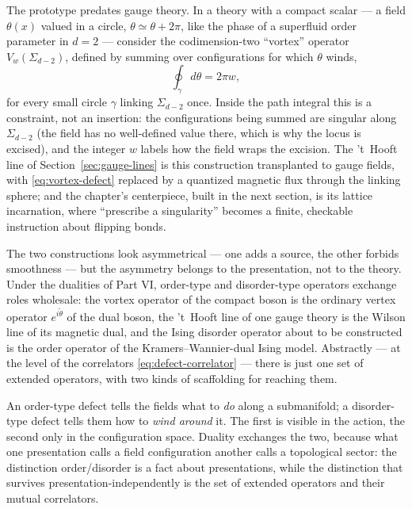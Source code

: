 The prototype predates gauge theory. In a theory with a compact scalar ---
a field $\theta(x)$ valued in a circle, $\theta \simeq \theta + 2\pi$, like
the phase of a superfluid order parameter in $d = 2$ --- consider the
codimension-two ``vortex'' operator $V_w(\Sigma_{d-2})$, defined by summing
over configurations for which $\theta$ winds,
\begin{equation}
\oint_{\gamma} d\theta = 2\pi w ,
\label{eq:vortex-defect}
\end{equation}
for every small circle $\gamma$ linking $\Sigma_{d-2}$ once. Inside the
path integral this is a constraint, not an insertion: the configurations
being summed are singular along $\Sigma_{d-2}$ (the field has no
well-defined value there, which is why the locus is excised), and the
integer $w$ labels how the field wraps the excision. The 't~Hooft line of
Section~\ref{sec:gauge-lines} is this construction transplanted to gauge
fields, with \eqref{eq:vortex-defect} replaced by a quantized magnetic
flux through the linking sphere; and the chapter's centerpiece, built in
the next section, is its lattice incarnation, where ``prescribe a
singularity'' becomes a finite, checkable instruction about flipping
bonds.

The two constructions look asymmetrical --- one adds a source, the other
forbids smoothness --- but the asymmetry belongs to the presentation, not
to the theory. Under the dualities of Part VI, order-type and
disorder-type operators exchange roles wholesale: the vortex operator of
the compact boson is the ordinary vertex operator $e^{i\tilde\theta}$ of
the dual boson, the 't~Hooft line of one gauge theory is the Wilson line
of its magnetic dual, and the Ising disorder operator about to be
constructed is the order operator of the Kramers--Wannier-dual Ising
model. Abstractly --- at the level of the correlators
\eqref{eq:defect-correlator} --- there is just one set of extended
operators, with two kinds of scaffolding for reaching them.

\begin{iintuition}
\label{int:order-disorder}
An order-type defect tells the fields what to \emph{do} along a
submanifold; a disorder-type defect tells them how to \emph{wind around}
it. The first is visible in the action, the second only in the
configuration space. Duality exchanges the two, because what one
presentation calls a field configuration another calls a topological
sector: the distinction order/disorder is a fact about presentations,
while the distinction that survives presentation-independently is the set
of extended operators and their mutual correlators.
\end{iintuition}


